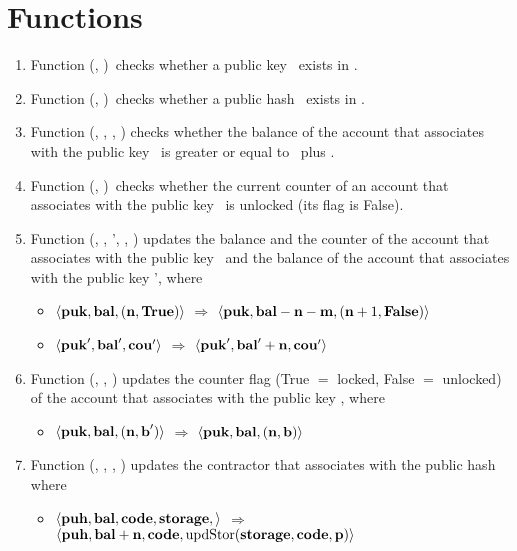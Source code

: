 \documentclass[a4paper]{llncs}
\begin{document}
\section{Functions}
\begin{enumerate}
    \item Function \CHECKPUB (\PUK, \MANAGERS)\ checks whether a public key \PUK\ exists in \MANAGERS.
    \item Function \CHECKPUH (\PUH, \CONTRACTORS)\ checks whether a public hash \PUH\ exists in \CONTRACTORS.
    \item Function \CHECKBAL (\MANAGERS, \PUK, \NTEZ, \MTEZ) checks whether the balance of the account that associates with the public key \PUK\ is greater or equal to \NTEZ\ plus \MTEZ.
    \item Function \CHECKCOU (\MANAGERS, \PUK)\ checks whether the current counter of an account that associates with the public key \PUK\ is unlocked (its flag is False).

    \item Function \UPDATESUCC(\MANAGERS, \PUK, \PUK', \NTEZ, \MTEZ) updates the balance and the counter of the account that associates with the public key \PUK\ and the balance of the account that associates with the public key \PUK', where
    \begin{itemize}
        \item[]  $\langle  \textbf{puk}, \textbf{bal}, (\textbf{n}, \textbf{True}) \rangle $ $\Rightarrow$ $\langle  \textbf{puk}, \textbf{bal} - \textbf{n} - \textbf{m}, (\textbf{n} + 1, \textbf{False}) \rangle $      
        \item[] $\langle  \textbf{puk}', \textbf{bal}', \textbf{cou}' \rangle$ $\Rightarrow$ $\langle  \textbf{puk}', \textbf{bal}' + \textbf{n}, \textbf{cou}' \rangle $         
    \end{itemize}
    
    \item Function \UPDATECOU(\MANAGERS, \PUK, \BOOLEAN) updates the counter flag (True $=$ locked, False $=$ unlocked) of the account that associates with the public key \PUK, where
    \begin{itemize}
        \item[]  $\langle  \textbf{puk}, \textbf{bal}, (\textbf{n}, \textbf{b}') \rangle $ $\Rightarrow$ $\langle  \textbf{puk}, \textbf{bal}, (\textbf{n}, \textbf{b}) \rangle $ 
    \end{itemize}
    
    \item Function  \UPDATECONSTR (\CONTRACTORS, \PUH, \NTEZ, \PARAMETER) updates the contractor that associates with the public hash \PUH\, where
    \begin{itemize}
        \item[] $\langle  \textbf{puh}, \textbf{bal}, \textbf{code}, \textbf{storage}, \rangle $ $\Rightarrow$ $\langle  \textbf{puh}, \textbf{bal} + \textbf{n}, \textbf{code}, \\ \textup{updStor}(\textbf{storage},\textbf{code},\textbf{p}) \rangle $
    \end{itemize}
    

\end{enumerate}
\end{document}
